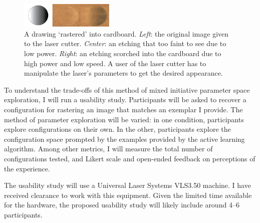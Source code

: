 \documentclass[12pt]{article}
\begin{document}
\begin{figure}
  \centering
  \includegraphics[width=0.4\textwidth]{figures/rasters}
  \caption{%
  A drawing `rastered' into cardboard.
  \emph{Left}: the original image given to the laser cutter.
  \emph{Center}: an etching that too faint to see due to low power.
  \emph{Right}: an etching scorched into the cardboard due to high power and low speed.
  A user of the laser cutter has to manipulate the laser's parameters to get the desired appearance.}
\label{fig:rasters}
\end{figure}

To understand the trade-offs of this method of mixed initiative parameter space exploration, I will run a usability study.
Participants will be asked to recover a configuration for rastering an image that matches an exemplar I provide.
The method of parameter exploration will be varied:
in one condition, participants explore configurations on their own.
In the other, participants explore the configuration space prompted by the examples provided by the active learning algorithm.
Among other metrics, I will measure the total number of configurations tested, and Likert scale and open-ended feedback on perceptions of the experience.

The usability study will use a Universal Laser Systems VLS3.50 machine.
I have received clearance to work with this equipment.
Given the limited time available for the hardware, the proposed usability study will likely include around 4--6 participants.

\printbibliography[heading=none]
\end{document}
